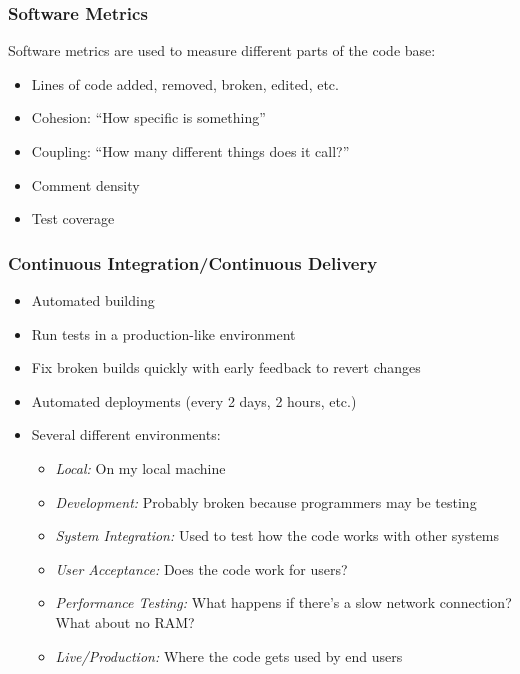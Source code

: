 \subsubsection{Software Metrics}\label{ssub:software_metrics}

Software metrics are used to measure different parts of the code base:

\begin{itemize}
    \item Lines of code added, removed, broken, edited, etc.
    \item Cohesion: ``How specific is something''
    \item Coupling: ``How many different things does it call?''
    \item Comment density
    \item Test coverage
\end{itemize}

\subsubsection{Continuous Integration/Continuous Delivery}\label{ssub:continuous_integration_continuous_delivery}

\begin{itemize}
    \item Automated building
    \item Run tests in a production-like environment
    \item Fix broken builds quickly with early feedback to revert changes
    \item Automated deployments (every 2 days, 2 hours, etc.)
    \item Several different environments:
          \begin{itemize}
              \item \emph{Local:} On my local machine
              \item \emph{Development:} Probably broken because programmers may be testing
              \item \emph{System Integration:} Used to test how the code works with other systems
              \item \emph{User Acceptance:} Does the code work for users?
              \item \emph{Performance Testing:} What happens if there's a slow network connection? What about no RAM?
              \item \emph{Live/Production:} Where the code gets used by end users
          \end{itemize}
\end{itemize}

